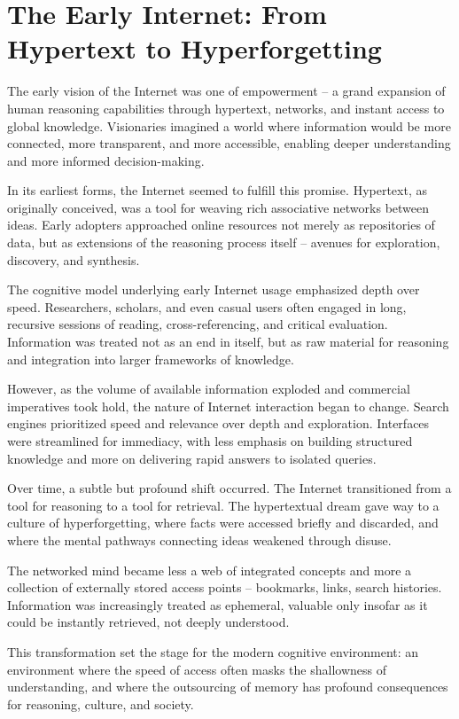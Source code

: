 \section{The Early Internet: From Hypertext to Hyperforgetting}

The early vision of the Internet was one of empowerment -- a grand
expansion of human reasoning capabilities through hypertext, networks,
and instant access to global knowledge. Visionaries imagined a world
where information would be more connected, more transparent, and more
accessible, enabling deeper understanding and more informed
decision-making.

In its earliest forms, the Internet seemed to fulfill this promise.
Hypertext, as originally conceived, was a tool for weaving rich
associative networks between ideas. Early adopters approached online
resources not merely as repositories of data, but as extensions of the
reasoning process itself -- avenues for exploration, discovery, and
synthesis.

The cognitive model underlying early Internet usage emphasized depth
over speed. Researchers, scholars, and even casual users often engaged
in long, recursive sessions of reading, cross-referencing, and critical
evaluation. Information was treated not as an end in itself, but as raw
material for reasoning and integration into larger frameworks of
knowledge.

However, as the volume of available information exploded and commercial
imperatives took hold, the nature of Internet interaction began to
change. Search engines prioritized speed and relevance over depth and
exploration. Interfaces were streamlined for immediacy, with less
emphasis on building structured knowledge and more on delivering rapid
answers to isolated queries.

Over time, a subtle but profound shift occurred. The Internet
transitioned from a tool for reasoning to a tool for retrieval. The
hypertextual dream gave way to a culture of hyperforgetting, where facts
were accessed briefly and discarded, and where the mental pathways
connecting ideas weakened through disuse.

The networked mind became less a web of integrated concepts and more a
collection of externally stored access points -- bookmarks, links, search
histories. Information was increasingly treated as ephemeral, valuable
only insofar as it could be instantly retrieved, not deeply understood.

This transformation set the stage for the modern cognitive environment:
an environment where the speed of access often masks the shallowness of
understanding, and where the outsourcing of memory has profound
consequences for reasoning, culture, and society.


